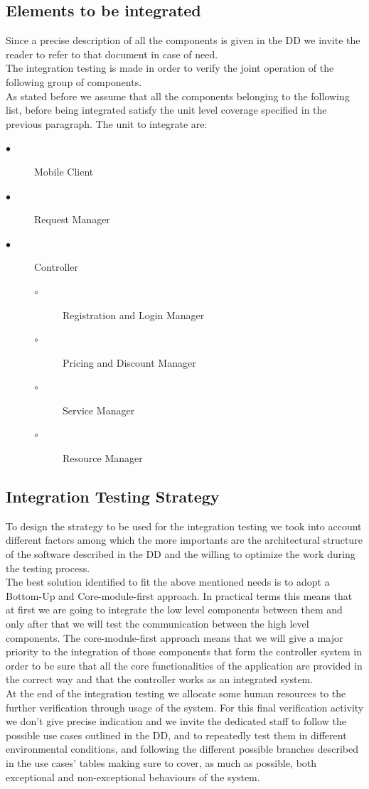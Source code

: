 \documentclass[a4paper,10pt]{article}
\begin{document}
\subsection{Elements to be integrated} Since a precise description of all the components is given in the DD we invite the reader to refer to that document in case of need.\\
The integration testing is made in order to verify the joint operation of the following group of components. \\
As stated before we assume that all the components belonging to the following list, before being integrated
satisfy the unit level coverage specified in the previous paragraph. The unit to integrate are:
\begin{description}
    \item[$\bullet$] Mobile Client
    \item[$\bullet$] Request Manager
    \item[$\bullet$] Controller
\begin{description}
    \item[$\circ$] Registration and Login Manager
    \item[$\circ$] Pricing and Discount Manager
    \item[$\circ$] Service Manager
    \item[$\circ$] Resource Manager
  \end{description}
  \end{description}
\subsection{Integration Testing Strategy} To design the strategy to be used for the integration testing
we took into account different factors among which the more importants are the architectural structure of the software
described in the DD and the willing to optimize the work during the testing process.\\ The best solution identified
to fit the above mentioned needs is to adopt a Bottom-Up and Core-module-first approach. In practical terms this means that at first
we are going to integrate the low level components between them and only after that we
will test the communication between the high level components. The core-module-first approach means
that we will give a major priority to the integration of those components that form the controller system in order
to be sure that all the core functionalities of the application are provided in the correct way and that the controller
works as an integrated system.\\
At the end of the integration testing we allocate some human resources to the further verification through usage of the system.
For this final verification activity we don't give precise indication and we invite the dedicated staff to follow the possible
use cases outlined in the DD, and to repeatedly test them in different environmental conditions,
and following the different possible branches described in the 
use cases' tables making sure to cover, as much as possible, both exceptional and non-exceptional behaviours of the system.
\end{document}

